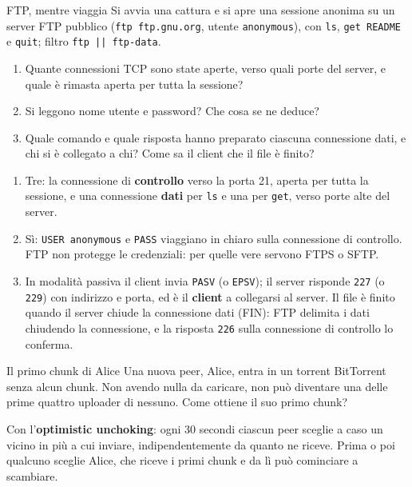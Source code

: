 \begin{esercizio}{FTP, mentre viaggia}
Si avvia una cattura e si apre una sessione anonima su un server FTP pubblico (\texttt{ftp ftp.gnu.org}, utente \texttt{anonymous}),
con \texttt{ls}, \texttt{get README} e \texttt{quit}; filtro \texttt{ftp || ftp-data}.
\begin{enumerate}[label=(\alph*)]
    \item Quante connessioni TCP sono state aperte, verso quali porte del server, e quale è rimasta aperta per tutta la sessione?
    \item Si leggono nome utente e password? Che cosa se ne deduce?
    \item Quale comando e quale risposta hanno preparato ciascuna connessione dati, e chi si è collegato a chi? Come sa il client che il
          file è finito?
\end{enumerate}

\svolgimento
\begin{enumerate}[label=(\alph*)]
    \item Tre: la connessione di \textbf{controllo} verso la porta 21, aperta per tutta la sessione, e una connessione \textbf{dati} per
          \texttt{ls} e una per \texttt{get}, verso porte alte del server.
    \item Sì: \texttt{USER anonymous} e \texttt{PASS} viaggiano in chiaro sulla connessione di controllo. FTP non protegge le credenziali:
          per quelle vere servono FTPS o SFTP.
    \item In modalità passiva il client invia \texttt{PASV} (o \texttt{EPSV}); il server risponde \texttt{227} (o \texttt{229}) con
          indirizzo e porta, ed è il \textbf{client} a collegarsi al server. Il file è finito quando il server chiude la connessione dati
          (FIN): FTP delimita i dati chiudendo la connessione, e la risposta \texttt{226} sulla connessione di controllo lo conferma.
\end{enumerate}
\end{esercizio}

\begin{esercizio}{Il primo chunk di Alice}
Una nuova peer, Alice, entra in un torrent BitTorrent senza alcun chunk. Non avendo nulla da caricare, non può diventare una delle
prime quattro uploader di nessuno. Come ottiene il suo primo chunk?

\svolgimento
Con l'\textbf{optimistic unchoking}: ogni 30 secondi ciascun peer sceglie a caso un vicino in più a cui inviare, indipendentemente da
quanto ne riceve. Prima o poi qualcuno sceglie Alice, che riceve i primi chunk e da lì può cominciare a scambiare.
\end{esercizio}

